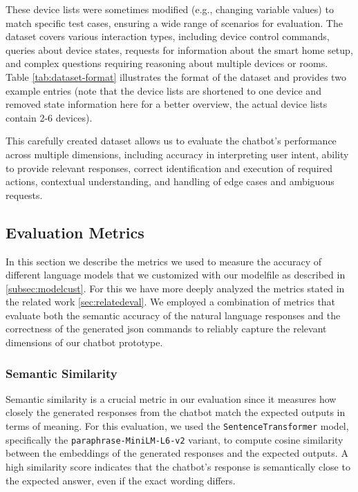 These device lists were sometimes modified (e.g., changing variable values) to match specific test cases, ensuring a wide range of scenarios for evaluation.
The dataset covers various interaction types, including device control commands, queries about device states, requests for information about the smart home setup, and complex questions requiring reasoning about multiple devices or rooms.
Table \ref{tab:dataset-format} illustrates the format of the dataset and provides two example entries (note that the device lists are shortened to one device and removed state information here for a better overview, the actual device lists contain 2-6 devices).

This carefully created dataset allows us to evaluate the chatbot's performance across multiple dimensions, including accuracy in interpreting user intent, ability to provide relevant responses, correct identification and execution of required actions, contextual understanding, and handling of edge cases and ambiguous requests.


\subsection{Evaluation Metrics}
In this section we describe the metrics we used to measure the accuracy of different language models that we customized with our modelfile as described in \cref{subsec:modelcust}.
For this we have more deeply analyzed the metrics stated in the related work \cref{sec:relatedeval}.
We employed a combination of metrics that evaluate both the semantic accuracy of the natural language responses and the correctness of the generated \gls{json} commands to reliably capture the relevant dimensions of our chatbot prototype.

\subsubsection{Semantic Similarity}

Semantic similarity is a crucial metric in our evaluation since it measures how closely the generated responses from the chatbot match the expected outputs in terms of meaning. For this evaluation, we used the \texttt{SentenceTransformer} model, specifically the \texttt{paraphrase-MiniLM-L6-v2} variant, to compute cosine similarity between the embeddings of the generated responses and the expected outputs. A high similarity score indicates that the chatbot's response is semantically close to the expected answer, even if the exact wording differs.

